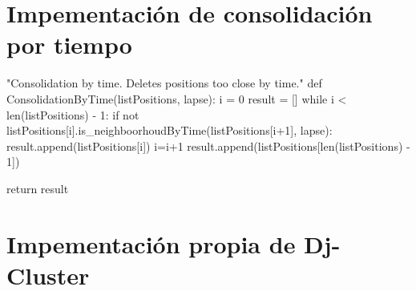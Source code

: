\documentclass[a4paper, 12pt]{article}
\begin{document}
\newpage
\section{Impementaci\'on de consolidaci\'on por tiempo} \label{App:AppendixE}

\begin{python}
"Consolidation by time. Deletes positions too close by time."
def ConsolidationByTime(listPositions, lapse):
	i = 0
	result = []
	while i < len(listPositions) - 1:
		if not listPositions[i].is_neighboorhoudByTime(listPositions[i+1], lapse):
			result.append(listPositions[i])
		i=i+1
	result.append(listPositions[len(listPositions) - 1])

	return result
\end{python}

\newpage
\section{Impementaci\'on propia de Dj-Cluster} \label{App:AppendixF}
\end{document}
